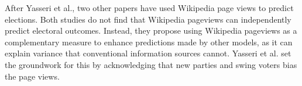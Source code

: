 After Yasseri et al., two other papers \cite{Salem2021Jun, Smith2017Sep} have used Wikipedia page views to predict elections. Both studies do not find that Wikipedia pageviews can independently predict electoral outcomes. Instead, they propose using Wikipedia pageviews as a complementary measure to enhance predictions made by other models, as it can explain variance that conventional information sources cannot. Yasseri et al.  set the groundwork for this by acknowledging that new parties and swing voters bias the page views.
  





